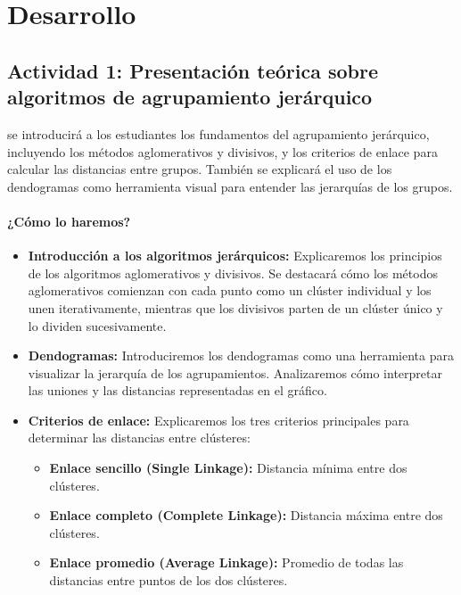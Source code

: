 \documentclass[a4,11pt]{aleph-notas}
\begin{document}
\section*{Desarrollo}

\subsection*{Actividad 1: Presentación teórica sobre algoritmos de agrupamiento jerárquico}

se introducirá a los estudiantes los fundamentos del agrupamiento jerárquico, incluyendo los métodos aglomerativos y divisivos, y los criterios de enlace para calcular las distancias entre grupos. También se explicará el uso de los dendogramas como herramienta visual para entender las jerarquías de los grupos.

\paragraph{¿Cómo lo haremos?}  
\begin{itemize}[leftmargin=*]
    \item \textbf{Introducción a los algoritmos jerárquicos:}  
    Explicaremos los principios de los algoritmos aglomerativos y divisivos. Se destacará cómo los métodos aglomerativos comienzan con cada punto como un clúster individual y los unen iterativamente, mientras que los divisivos parten de un clúster único y lo dividen sucesivamente.
    
    \item \textbf{Dendogramas:}  
    Introduciremos los dendogramas como una herramienta para visualizar la jerarquía de los agrupamientos. Analizaremos cómo interpretar las uniones y las distancias representadas en el gráfico.
    
    \item \textbf{Criterios de enlace:}  
    Explicaremos los tres criterios principales para determinar las distancias entre clústeres:
    \begin{itemize}
        \item \textbf{Enlace sencillo (Single Linkage):} Distancia mínima entre dos clústeres.
        \item \textbf{Enlace completo (Complete Linkage):} Distancia máxima entre dos clústeres.
        \item \textbf{Enlace promedio (Average Linkage):} Promedio de todas las distancias entre puntos de los dos clústeres.
    \end{itemize}

\end{itemize}
\end{document}
